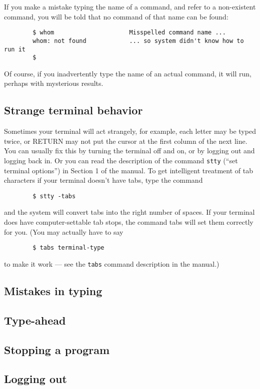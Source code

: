 If you make a mistake typing the name of a command, and refer to a non-existent
command, you will be told that no command of that name can be found:
\begin{verbatim}
        $ whom                     Misspelled command name ...    
        whom: not found            ... so system didn't know how to run it
        $
\end{verbatim}
Of course, if you inadvertently type the name of an actual command, it will run,
perhaps with mysterious results.


\subsection{Strange terminal behavior}

Sometimes your terminal will act strangely, for example, each letter may be
typed twice, or RETURN may not put the cursor at the first column of the next
line. You can usually fix this by turning the terminal off and on, or by logging
out and logging back in. Or you can read the description of the command
\texttt{stty} (``set terminal options'') in Section 1 of the manual. To get
intelligent treatment of tab characters if your terminal doesn't have tabs, type
the command
\begin{verbatim}
        $ stty -tabs
\end{verbatim}
and the system will convert tabs into the right number of spaces. If your
terminal does have computer-settable tab stops, the command tabs will set them
correctly for you. (You may actually have to say
\begin{verbatim}
        $ tabs terminal-type
\end{verbatim}
to make it work --- see the \texttt{tabs} command description in the manual.)


\subsection{Mistakes in typing}
\subsection{Type-ahead}
\subsection{Stopping a program}
\subsection{Logging out}
